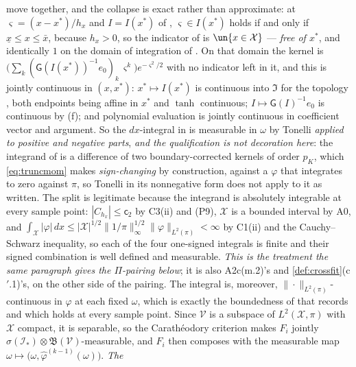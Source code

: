 \begin{enumerate}
{move together, and the collapse is exact rather than approximate}: at $\varsigma=(x-x^\ast)/h_x$ and
$I=I(x^\ast)$ of , $\varsigma\in I(x^\ast)$ holds if and only if
$\underline x\le x\le\bar x$, because $h_x>0$, so the indicator of  is
$\un\{x\in\mathcal X\}$ --- \emph{free of $x^\ast$}, and identically $1$ on the domain of integration
of . On that domain the kernel is
$\big(\sum_{k}(\mathsf G(I(x^\ast))^{-1}e_0)_k\,\varsigma^{k}\big)e^{-\varsigma^{2}/2}$ with no
indicator left in it, and this is jointly continuous in $(x,x^\ast)$: $x^\ast\mapsto I(x^\ast)$ is
continuous into $\mathfrak I$ for the topology , both endpoints being affine in
$x^\ast$ and $\tanh$ continuous; $I\mapsto\mathsf G(I)^{-1}e_0$ is continuous by
\textup{(f)}; and polynomial evaluation is jointly continuous in coefficient
vector and argument. So the $dx$-integral in  is measurable in $\omega$ by Tonelli
\emph{applied to positive and negative parts}, \emph{and the qualification is not decoration here}: the
integrand of  is a difference of two boundary-corrected kernels of order $p_K$, which
\eqref{eq:truncmom} makes \emph{sign-changing} by construction, against a $\varphi$ that integrates to zero
against $\pi$, so Tonelli in its nonnegative form does not apply to it as written. The split is legitimate
because the integrand is absolutely integrable at every sample point: $|C_{h_x}|\le\mathsf c_2$ by C3(ii)
and \textup{(P9)}, $\mathcal X$ is a bounded interval by A0, and
$\int_{\mathcal X}|\varphi|\,dx\le|\mathcal X|^{1/2}\|1/\pi\|^{1/2}_\infty\|\varphi\|_{L^{2}(\pi)}<\infty$
by C1(ii) and the Cauchy--Schwarz inequality, so each of the four one-signed integrals is finite and their
signed combination is well defined and measurable. \emph{This is the treatment the same paragraph gives the
$\Pi$-pairing below}; it is also
A2c\textup{(m.2)}'s and \cref{def:crossfit}\textup{(c$'$.1)}'s, on the other
side of the pairing. The integral is, moreover,
$\|\cdot\|_{L^{2}(\pi)}$-continuous in $\varphi$ at each fixed $\omega$, which is exactly the boundedness of
 that  records and which holds at every sample point. Since $\mathcal V$
is a subspace of $L^{2}(\mathcal X,\pi)$ with $\mathcal X$ compact, it is separable, so the Carath\'eodory
criterion makes $F_i$ jointly $\sigma(\mathcal I_\ast)\otimes\mathfrak B(\mathcal V)$-measurable, and $F_i$ then
composes with the measurable map $\omega\mapsto\big(\omega,\hat\varphi^{(k-1)}(\omega)\big)$. \emph{The
}
\end{enumerate}
